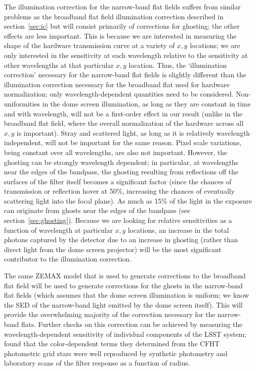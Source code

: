 \documentclass[12pt,preprint]{aastex}
\begin{document}
The illumination correction for the narrow-band flat fields suffers
from similar problems as the broadband flat field illumination
correction described in section~\ref{sec:ic} but will consist
primarily of corrections for ghosting; the other
effects are less important. This is because we are interested in measuring the shape of
the hardware transmission curve at a variety of $x,y$ locations; we
are only interested in the sensitivity at each wavelength relative to
the sensitivity at other wavelengths at that particular $x,y$
location. Thus, the `illumination correction' necessary for the
narrow-band flat fields is slightly different than the illumination
correction necessary for the broadband flat used for hardware
normalization; only wavelength-dependent quantities need to be
considered. Non-uniformities in the dome screen illumination, as long as
they are constant in time and with wavelength, will not be a
first-order effect in our result (unlike in the broadband flat field,
where the overall normalization of the hardware across all $x,y$ is
important).  Stray and scattered light, as long as it is relatively
wavelength independent, will not be important for the same
reason. Pixel scale variations, being constant over all wavelengths,
are also not important.  However, the ghosting can be strongly wavelength dependent; in
particular, at wavelengths near the edges of the bandpass, the ghosting resulting from
reflections off the surfaces of the filter itself becomes a
significant factor (since the chances of transmission or reflection
hover at 50\%, increasing the chances of eventually scattering light
into the focal plane). As much as 15\% of the light in the exposure
can originate from ghosts near the edges of the bandpass
\citep{Stubbs2010a} (see section~\ref{sec:ghosting}). Because we are
looking for relative sensitivities as a function of wavelength at
particular $x,y$ locations, an increase in the total photons captured
by the detector due to an increase in ghosting (rather than direct
light from the dome screen projector) will be the most significant
contributor to the illumination correction.

The same ZEMAX model that is used to generate corrections to the
broadband flat field will be used to generate corrections for the
ghosts in the narrow-band flat fields (which assumes that the dome
screen illumination is uniform; we know the SED of the narrow-band
light emitted by the dome screen itself).  This will provide the
overwhelming majority of the correction necessary for the narrow-band
flats.  Further checks on this correction can be achieved by measuring
the wavelength-dependent sensitivity of individual components of the
LSST system; \citet{Regnault2009} found that the color-dependent terms
they determined from the CFHT photometric grid stars were well
reproduced by synthetic photometry and laboratory scans of the filter
response as a function of radius.
\end{document}
